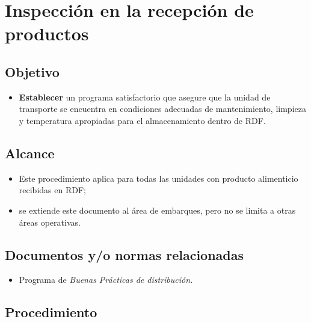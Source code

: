 \renewcommand{\MayorVer}{2}
\renewcommand{\MenorVer}{1}
\renewcommand{\Codigo}{PSA-1-PROG}
\renewcommand{\FechaPub}{2023--01}
\renewcommand{\Titulo}{Inspección en la recepción de productos}

\section{\Titulo}

\subsection{Objetivo}
\begin{itemize}
	\item \textbf{Establecer} un programa satisfactorio que asegure que la unidad de transporte se encuentra en condiciones adecuadas de mantenimiento, limpieza y temperatura apropiadas para el almacenamiento dentro de RDF.
\end{itemize}

\subsection{Alcance}
\begin{itemize}
	\item Este procedimiento aplica para todas las unidades con producto alimenticio recibidas en RDF;
	\item se extiende este documento al área de embarques, pero no se limita a otras áreas operativas.
\end{itemize}


\subsection{Documentos y/o normas relacionadas}
\begin{itemize}
	\item Programa de \textit{Buenas Prácticas de distribución.}
\end{itemize}

\subsection{Procedimiento}
